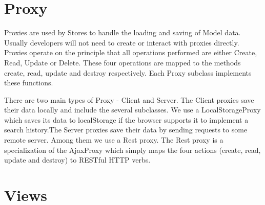 \section{Proxy}
\par Proxies are used by Stores to handle the loading and saving of Model data. Usually developers will not need to create or interact with proxies directly. Proxies operate on the principle that all operations performed are either Create, Read, Update or Delete. These four operations are mapped to the methods create, read, update and destroy respectively. Each Proxy subclass implements these functions. \\
\par There are two main types of Proxy - Client and Server. The Client proxies save their data locally and include the several subclasses. We use a LocalStorageProxy which saves its data to localStorage if the browser supports it to implement a search history.The Server proxies save their data by sending requests to some remote server. Among them we use a Rest proxy. The Rest proxy is a specialization of the AjaxProxy which simply maps the four actions (create, read, update and destroy) to RESTful HTTP verbs. \\

\section{Views}
